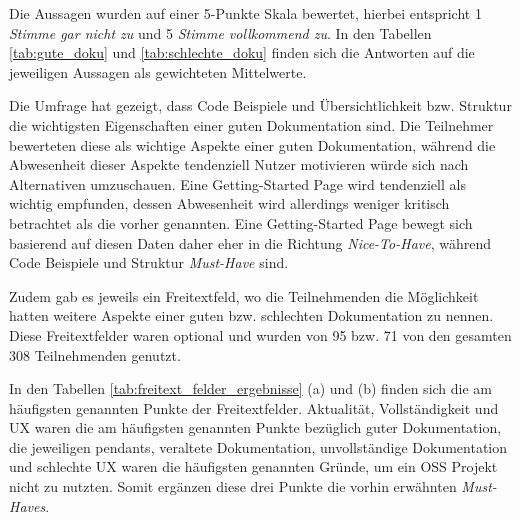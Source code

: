 

\bigskip
\noindent
Die Aussagen wurden auf einer 5-Punkte Skala bewertet, hierbei entspricht 1 \textit{Stimme gar nicht zu}
und 5 \textit{Stimme vollkommend zu}. In den Tabellen \ref{tab:gute_doku} und \ref{tab:schlechte_doku}
finden sich die Antworten auf die jeweiligen Aussagen als gewichteten Mittelwerte.

Die Umfrage hat gezeigt, dass Code Beispiele und Übersichtlichkeit bzw. Struktur die wichtigsten
Eigenschaften einer guten Dokumentation sind.
Die Teilnehmer bewerteten diese als wichtige Aspekte einer guten Dokumentation, während die
Abwesenheit dieser Aspekte tendenziell Nutzer motivieren würde sich nach Alternativen umzuschauen.
Eine Getting-Started Page wird tendenziell als wichtig empfunden, dessen Abwesenheit wird allerdings
weniger kritisch betrachtet als die vorher genannten. Eine Getting-Started Page bewegt sich basierend
auf diesen Daten daher eher in die Richtung \textit{Nice-To-Have}, während Code Beispiele und Struktur
\textit{Must-Have} sind.



Zudem gab es jeweils ein Freitextfeld, wo die Teilnehmenden die Möglichkeit hatten weitere Aspekte
einer guten bzw. schlechten Dokumentation zu nennen. Diese Freitextfelder waren optional und wurden
von  95 bzw. 71 von den gesamten 308 Teilnehmenden genutzt.

\bigskip
\noindent
In den Tabellen \ref{tab:freitext_felder_ergebnisse} (a) und (b) finden sich die am häufigsten genannten
Punkte der Freitextfelder. Aktualität, Vollständigkeit und UX waren die am häufigsten genannten Punkte
bezüglich guter Dokumentation, die jeweiligen pendants, veraltete Dokumentation, unvollständige
Dokumentation und schlechte UX waren die häufigsten genannten Gründe, um ein OSS Projekt nicht zu
nutzten. Somit ergänzen diese drei Punkte die vorhin erwähnten \textit{Must-Haves}.


\bigskip
\noindent
{}

